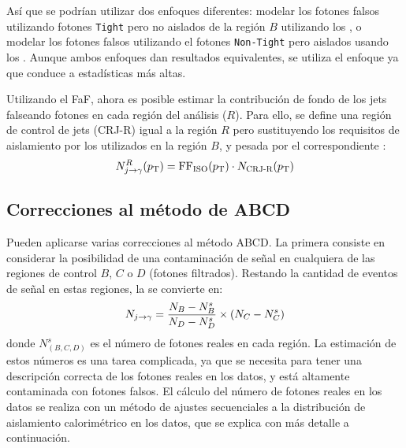 Así que se podrían utilizar dos enfoques diferentes: modelar los fotones falsos utilizando fotones \texttt{Tight} pero no aislados de la región \(B\) utilizando los \ffiso, o modelar los fotones falsos utilizando el fotones \texttt{Non-Tight} pero aislados usando los \ffid.
Aunque ambos enfoques dan resultados equivalentes, se utiliza el enfoque \ffiso ya que conduce a estadísticas más altas.


Utilizando el \ac{FaF}, ahora es posible estimar la contribución de fondo de los jets falseando fotones en cada región del análisis (\(R\)). Para ello, se define una región de control de jets (CRJ-R) igual a la región \(R\) pero sustituyendo los requisitos de aislamiento por los utilizados en la región \(B\), y pesada por el correspondiente \ffiso:
\begin{equation*}
    N^{R}_{j\rightarrow\gamma}(p_{\text{T}}) = \text{FF}_{\text{ISO}}(p_{\text{T}})\cdot N_{\text{CRJ-R}}(p_{\text{T}})
\end{equation*}





\subsection{Correcciones al método de ABCD}
\label{subsec:bkg:estimation:abcd_corrections}

Pueden aplicarse varias correcciones al método ABCD.
La primera consiste en considerar la posibilidad de una contaminación de señal en cualquiera de las regiones de control \(B\), \(C\) o \(D\) (fotones filtrados). Restando la cantidad de eventos de señal en estas regiones, la \Eqn{\ref{eq:bkg:estimation:abcd:njfakes}} se convierte en:
\begin{equation}
    \label{eq:bkg:estimation:abcd_corrections:njfakes_leak}
    N_{j\rightarrow\gamma} = \frac{N_{B} - N_{B}^{s}}{N_{D} - N_{D}^{s}} \times (N_{C} - N_{C}^{s})
\end{equation}
donde \(N_{(B,C,D)}^{s}\) es el número de fotones reales en cada región. La estimación de estos números es una tarea complicada, ya que se necesita para tener una descripción correcta de los fotones reales en los datos, y está altamente contaminada con fotones falsos. El cálculo del número de fotones reales en los datos se realiza con un método de ajustes secuenciales a la distribución de aislamiento calorimétrico en los datos, que se explica con más detalle a continuación.


